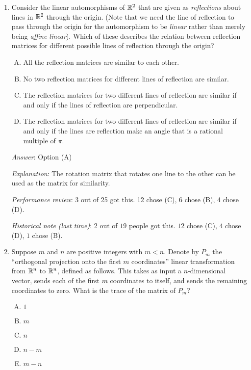 \documentclass[10pt]{amsart}
\begin{document}
\begin{enumerate}
  {\em Performance review}: 12 out of 25 got this. 9 chose (D), 4 chose (A).

  {\em Historical note (last time)}: $9$ out of $19$ got this. $4$ each chose
  (A) and (D), $2$ chose (C).

\item Consider the linear automorphisms of $\mathbb{R}^2$ that are given as
  {\em reflections} about lines in $\mathbb{R}^2$ through the origin. (Note
  that we need the line of reflection to pass through the origin for
  the automorphism to be {\em linear} rather than merely being {\em
    affine linear}). Which of these describes the relation between
  reflection matrices for different possible lines of reflection
  through the origin?

  \begin{enumerate}[(A)]
  \item All the reflection matrices are similar to each other.
  \item No two reflection matrices for different lines of reflection are similar.
  \item The reflection matrices for two different lines of reflection
    are similar if and only if the lines of reflection are
    perpendicular.
  \item The reflection matrices for two different lines of reflection
    are similar if and only if the lines are reflection make an angle
    that is a rational multiple of $\pi$.
  \end{enumerate}

  {\em Answer}: Option (A)

  {\em Explanation}: The rotation matrix that rotates one line to the
  other can be used as the matrix for similarity.

  {\em Performance review}: 3 out of 25 got this. 12 chose (C), 6
  chose (B), 4 chose (D).

  {\em Historical note (last time)}: $2$ out of $19$ people got this. $12$
  chose (C), $4$ chose (D), $1$ chose (B).

\item Suppose $m$ and $n$ are positive integers with $m < n$. Denote
  by $P_m$ the ``orthogonal projection onto the first $m$
  coordinates'' linear transformation from $\mathbb{R}^n$ to $\mathbb{R}^n$, defined
  as follows. This takes as input a $n$-dimensional vector, sends
  each of the first $m$ coordinates to itself, and sends the remaining
  coordinates to zero. What is the trace of the matrix of $P_m$?

  \begin{enumerate}[(A)]
  \item $1$
  \item $m$
  \item $n$
  \item $n - m$
  \item $m - n$
  \end{enumerate}


\end{enumerate}
\end{document}
